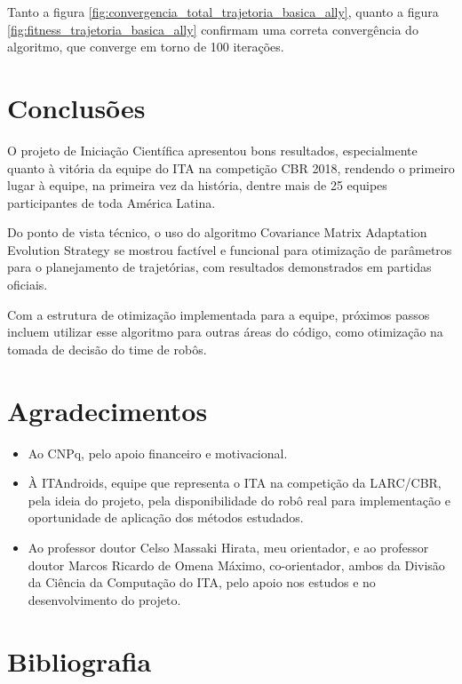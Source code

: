 \documentclass[a4paper,12pt]{article}
\begin{document}
Tanto a figura \ref{fig:convergencia_total_trajetoria_basica_ally}, quanto a figura \ref{fig:fitness_trajetoria_basica_ally} confirmam uma correta convergência do algoritmo, que converge em torno de 100 iterações.

\section{Conclusões}

O projeto de Iniciação Científica apresentou bons resultados, especialmente quanto à vitória da equipe do ITA na competição CBR 2018, rendendo o primeiro lugar à equipe, na primeira vez da história, dentre mais de 25 equipes participantes de toda América Latina.

Do ponto de vista técnico, o uso do algoritmo Covariance Matrix Adaptation Evolution Strategy se mostrou factível e funcional para otimização de parâmetros para o planejamento de trajetórias, com resultados demonstrados em partidas oficiais.

Com a estrutura de otimização implementada para a equipe, próximos passos incluem utilizar esse algoritmo para outras áreas do código, como otimização na tomada de decisão do time de robôs.

\section{Agradecimentos}

\begin{itemize}
\item Ao CNPq, pelo apoio financeiro e motivacional.
\item À ITAndroids, equipe que representa o ITA na competição da LARC/CBR, pela ideia do projeto, pela disponibilidade do robô real para implementação e oportunidade de aplicação dos métodos estudados.
\item Ao professor doutor Celso Massaki Hirata, meu orientador, e ao professor doutor Marcos Ricardo de Omena Máximo, co-orientador, ambos da Divisão da Ciência da Computação do ITA, pelo apoio nos estudos e no desenvolvimento do projeto.

\end{itemize}

\section{Bibliografia}

\printbibliography
\end{document}
